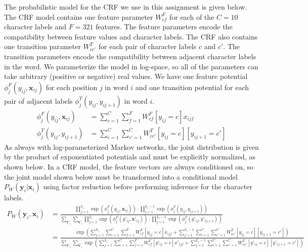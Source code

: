 \documentclass[11pt]{article}
\newcommand{\mbf}[1]{{\mathbf{#1}}}
\begin{document}
The probabilistic model for the CRF we use in this assignment is given below. The CRF model contains one feature parameter $W^F_{cf}$ for each of the $C=10$ character labels and $F=321$ features. The feature parameters encode the compatibility between feature values and character labels. The CRF also contains one transition parameter $W^T_{cc'}$ for each pair of character labels $c$ and $c'$.  The transition parameters encode the compatibility between adjacent character labels in the word. We parameterize the model in log-space, so all of the parameters can take arbitrary (positive or negative) real values. We have one feature potential
$\phi^F_j(y_{ij},\mbf{x}_{ij})$ for each position $j$ in word $i$ and one transition potential for each pair of adjacent labels $\phi^T_j(y_{ij},y_{ij+1})$ in word $i$.
%
\begin{align*}
\phi^F_j(y_{ij},\mbf{x}_{ij}) &= \sum_{c=1}^{C}\sum_{f=1}^F W^F_{cf}[y_{ij}=c]x_{ijf} \\
\phi^T_j(y_{ij},y_{ij+1}) &= \sum_{c=1}^{C}\sum_{c'=1}^{C}W^T_{cc'}[y_{ij}=c][y_{ij+1}=c']
\end{align*}
%
As always with log-parameterized Markov networks, the joint distribution is given by the product of exponentiated
potentials and must be explicitly normalized, as shown below. In a CRF model, the feature vectors are always conditioned on, so the joint model shown below must be transformed into a conditional model $P_{W}(\mbf{y}_i|\mbf{x}_i)$ using factor reduction before performing inference for the character labels.
%
\begin{align*}
P_{W}(\mbf{y}_i,\mbf{x}_i)
&=\frac{\displaystyle\prod_{j=1}^{L_i}\exp(\phi^F_j(y_{ij},\mbf{x}_{ij})) \cdot \prod_{j=1}^{L_i-1}\exp(\phi^T_j(y_{ij},y_{ij+1}))}
       {\displaystyle
         \sum_{\mbf{y}'_i}\sum_{\mbf{x}'_i}\prod_{j=1}^{L_i}\exp(\phi^F_j(y'_{ij},\mbf{x}'_{ij})) \cdot \prod_{j=1}^{L_i-1}\exp(\phi^T_j(y'_{ij},y'_{ij+1}))}\\
&= \frac{\displaystyle
     \exp\left(\sum_{j=1}^{L_i}\sum_{c=1}^{C}\sum_{f=1}^F W^F_{cf}[y_{ij}=c]x_{ijf}
     +\sum_{j=1}^{L_i-1}\sum_{c=1}^{C}\sum_{c'=1}^{C}W^T_{cc'}[y_{ij}=c][y_{ij+1}=c']\right)
   }
   {\displaystyle
     \sum_{\mbf{y}'_i}\sum_{\mbf{x}'_i}\exp\left(\sum_{j=1}^{L_i}\sum_{c=1}^{C}\sum_{f=1}^F
     W^F_{cf}[y'_{ij}=c]x'_{ijf}
     +\sum_{j=1}^{L_i-1}\sum_{c=1}^{C}\sum_{c'=1}^{C}W^T_{cc'}[y'_{ij}=c][y'_{ij+1}=c']\right)
   }
\end{align*}
\end{document}
